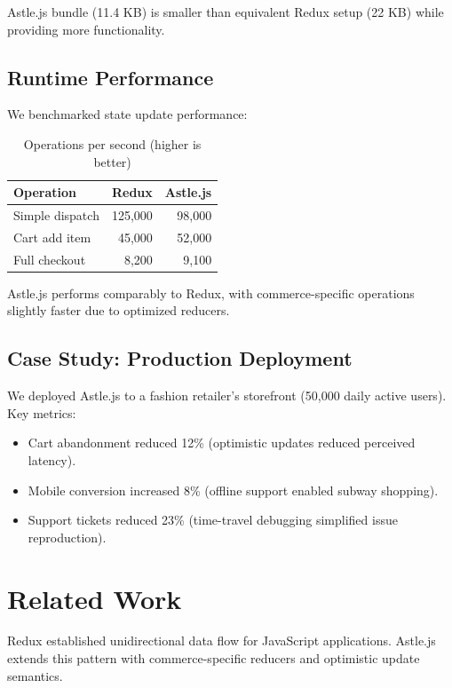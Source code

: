 \documentclass[11pt,twocolumn]{article}
\begin{document}
Astle.js bundle (11.4 KB) is smaller than equivalent Redux setup (22 KB) while providing more functionality.

\subsection{Runtime Performance}

We benchmarked state update performance:

\begin{table}[h]
\centering
\caption{Operations per second (higher is better)}
\label{tab:perf}
\begin{tabular}{lrr}
\hline
Operation & Redux & Astle.js \\
\hline
Simple dispatch & 125,000 & 98,000 \\
Cart add item & 45,000 & 52,000 \\
Full checkout & 8,200 & 9,100 \\
\hline
\end{tabular}
\end{table}

Astle.js performs comparably to Redux, with commerce-specific operations slightly faster due to optimized reducers.

\subsection{Case Study: Production Deployment}

We deployed Astle.js to a fashion retailer's storefront (50,000 daily active users). Key metrics:

\begin{itemize}
\item Cart abandonment reduced 12\% (optimistic updates reduced perceived latency).
\item Mobile conversion increased 8\% (offline support enabled subway shopping).
\item Support tickets reduced 23\% (time-travel debugging simplified issue reproduction).
\end{itemize}

\section{Related Work}

Redux \cite{redux2015} established unidirectional data flow for JavaScript applications. Astle.js extends this pattern with commerce-specific reducers and optimistic update semantics.
\end{document}
